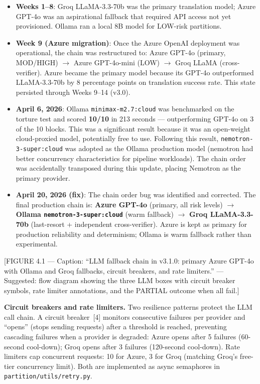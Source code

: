 \begin{itemize}
  \item \textbf{Weeks 1--8}: Groq LLaMA-3.3-70b was the primary translation
    model; Azure GPT-4o was an aspirational fallback that required API access
    not yet provisioned. Ollama ran a local 8B model for LOW-risk partitions.

  \item \textbf{Week 9 (Azure migration)}: Once the Azure OpenAI deployment
    was operational, the chain was restructured to: Azure GPT-4o (primary,
    MOD/HIGH) $\rightarrow$ Azure GPT-4o-mini (LOW) $\rightarrow$ Groq LLaMA
    (cross-verifier). Azure became the primary model because its GPT-4o
    outperformed LLaMA-3.3-70b by 8 percentage points on translation success
    rate. This state persisted through Weeks 9--14 (v3.0).

  \item \textbf{April 6, 2026}: Ollama \texttt{minimax-m2.7:cloud} was
    benchmarked on the torture test and scored \textbf{10/10} in 213 seconds
    --- outperforming GPT-4o on 3 of the 10 blocks. This was a significant
    result because it was an open-weight cloud-proxied model, potentially
    free to use. Following this result, \texttt{nemotron-3-super:cloud} was
    adopted as the Ollama production model (nemotron had better concurrency
    characteristics for pipeline workloads). The chain order was accidentally
    transposed during this update, placing Nemotron as the primary provider.

  \item \textbf{April 20, 2026 (fix)}: The chain order bug was identified and
    corrected. The final production chain is:
    \textbf{Azure GPT-4o} (primary, all risk levels) $\rightarrow$
    \textbf{Ollama \texttt{nemotron-3-super:cloud}} (warm fallback) $\rightarrow$
    \textbf{Groq LLaMA-3.3-70b} (last-resort + independent cross-verifier).
    Azure is kept as primary for production reliability and determinism;
    Ollama is warm fallback rather than experimental.
\end{itemize}

[FIGURE 4.1 --- Caption: ``LLM fallback chain in \codara{} v3.1.0: primary
Azure GPT-4o with Ollama and Groq fallbacks, circuit breakers, and rate
limiters.'' --- Suggested: flow diagram showing the three LLM boxes with
circuit breaker symbols, rate limiter annotations, and the PARTIAL outcome
when all fail.]

\textbf{Circuit breakers and rate limiters.} Two resilience patterns protect
the LLM call chain. A circuit breaker~[4] monitors consecutive failures per
provider and ``opens'' (stops sending requests) after a threshold is reached,
preventing cascading failures when a provider is degraded: Azure opens after
5 failures (60-second cool-down); Groq opens after 3 failures (120-second
cool-down). Rate limiters cap concurrent requests: 10 for Azure, 3 for Groq
(matching Groq's free-tier concurrency limit). Both are implemented as async
semaphores in \texttt{partition/utils/retry.py}.

